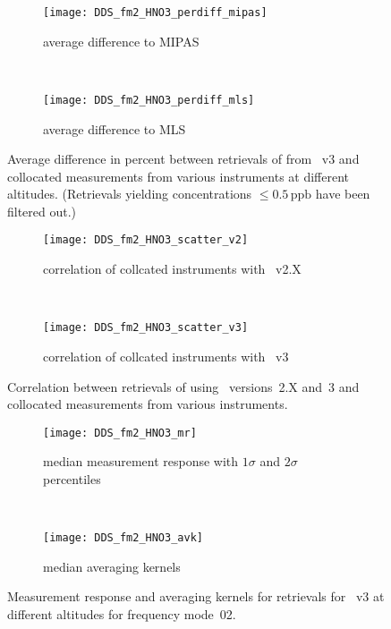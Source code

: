 \begin{figure}[tbhp]
    \centering
    \begin{subfigure}[b]{0.49\textwidth}
        \texttt{[image: DDS\_fm2\_HNO3\_perdiff\_mipas]}
        \caption{average difference to MIPAS}
        \label{fig:fm02:HNO3:profiles:MIPAS}
    \end{subfigure}
    \,
    \begin{subfigure}[b]{0.49\textwidth}
        \texttt{[image: DDS\_fm2\_HNO3\_perdiff\_mls]}
        \caption{average difference to MLS}
        \label{fig:fm02:HNO3:profiles:MLS}
    \end{subfigure}
    \caption{Average difference in percent between retrievals of 
    from \smr~v3 and collocated measurements from various instruments at
    different altitudes. (Retrievals yielding concentrations
    $\leq 0.5\,\mathrm{ppb}$ have been filtered out.)}

    \label{fig:fm02:HNO3:profiles}
\end{figure}

\begin{figure}[tbhp]
    \centering
    \begin{subfigure}[b]{0.49\textwidth}
        \texttt{[image: DDS\_fm2\_HNO3\_scatter\_v2]}
        \caption{correlation of collcated instruments with \smr~v2.X}
        \label{fig:fm02:HNO3:scatter:v2}
    \end{subfigure}
    \,
    \begin{subfigure}[b]{0.49\textwidth}
        \texttt{[image: DDS\_fm2\_HNO3\_scatter\_v3]}
        \caption{correlation of collcated instruments with \smr~v3}
        \label{fig:fm02:HNO3:scatter:v3}
    \end{subfigure}
    \caption{Correlation between retrievals of  using \smr\
    versions~2.X and~3 and collocated measurements from various instruments.}
    \label{fig:fm02:HNO3:scatter}
\end{figure}

\begin{figure}[tbhp]
    \centering
    \begin{subfigure}[b]{0.49\textwidth}
        \texttt{[image: DDS\_fm2\_HNO3\_mr]}
        \caption{median measurement response with $1\sigma$ and $2\sigma$
        percentiles}
        \label{fig:fm02:HNO3:mr}
    \end{subfigure}
    \,
    \begin{subfigure}[b]{0.49\textwidth}
        \texttt{[image: DDS\_fm2\_HNO3\_avk]}
        \caption{median averaging kernels\newline~}
        \label{fig:fm02:HNO3:avk}
    \end{subfigure}
    \caption{Measurement response and averaging kernels for 
    retrievals for \smr~v3 at different altitudes for frequency mode~02.}
    \label{fig:fm02:HNO3:mr_avk}
\end{figure}



